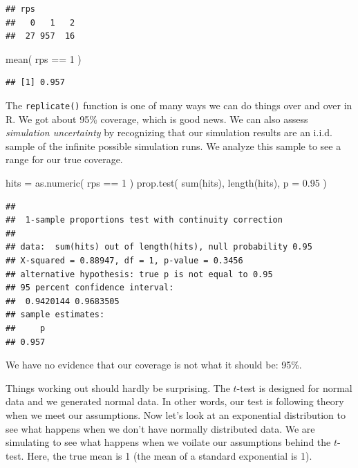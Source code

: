 \documentclass[
]{book}
\newenvironment{Shaded}{\begin{snugshade}}{\end{snugshade}}
\newcommand{\AttributeTok}[1]{\textcolor[rgb]{0.77,0.63,0.00}{#1}}
\newcommand{\DecValTok}[1]{\textcolor[rgb]{0.00,0.00,0.81}{#1}}
\newcommand{\FloatTok}[1]{\textcolor[rgb]{0.00,0.00,0.81}{#1}}
\newcommand{\FunctionTok}[1]{\textcolor[rgb]{0.00,0.00,0.00}{#1}}
\newcommand{\NormalTok}[1]{#1}
\newcommand{\OtherTok}[1]{\textcolor[rgb]{0.56,0.35,0.01}{#1}}
\newcommand{\SpecialCharTok}[1]{\textcolor[rgb]{0.00,0.00,0.00}{#1}}
\begin{document}
\begin{verbatim}
## rps
##   0   1   2 
##  27 957  16
\end{verbatim}

\begin{Shaded}
\begin{Highlighting}[]
\FunctionTok{mean}\NormalTok{( rps }\SpecialCharTok{==} \DecValTok{1}\NormalTok{ )}
\end{Highlighting}
\end{Shaded}

\begin{verbatim}
## [1] 0.957
\end{verbatim}

The \texttt{replicate()} function is one of many ways we can do things over and over in R.
We got about 95\% coverage, which is good news. We can also assess
\emph{simulation uncertainty} by recognizing that our simulation results are an
i.i.d. sample of the infinite possible simulation runs. We analyze this
sample to see a range for our true coverage.

\begin{Shaded}
\begin{Highlighting}[]
\NormalTok{hits }\OtherTok{=} \FunctionTok{as.numeric}\NormalTok{( rps }\SpecialCharTok{==} \DecValTok{1}\NormalTok{ )}
\FunctionTok{prop.test}\NormalTok{( }\FunctionTok{sum}\NormalTok{(hits), }\FunctionTok{length}\NormalTok{(hits), }\AttributeTok{p =} \FloatTok{0.95}\NormalTok{ )}
\end{Highlighting}
\end{Shaded}

\begin{verbatim}
## 
##  1-sample proportions test with continuity correction
## 
## data:  sum(hits) out of length(hits), null probability 0.95
## X-squared = 0.88947, df = 1, p-value = 0.3456
## alternative hypothesis: true p is not equal to 0.95
## 95 percent confidence interval:
##  0.9420144 0.9683505
## sample estimates:
##     p 
## 0.957
\end{verbatim}

We have no evidence that our coverage is not what it should be: 95\%.

Things working out should hardly be surprising. The \(t\)-test is designed for
normal data and we generated normal data. In other words, our test is
following theory when we meet our assumptions. Now let's look at an
exponential distribution to see what happens when we don't have normally
distributed data. We are simulating to see what happens when we voilate
our assumptions behind the \(t\)-test. Here, the true mean is 1 (the mean of a
standard exponential is 1).
\end{document}
